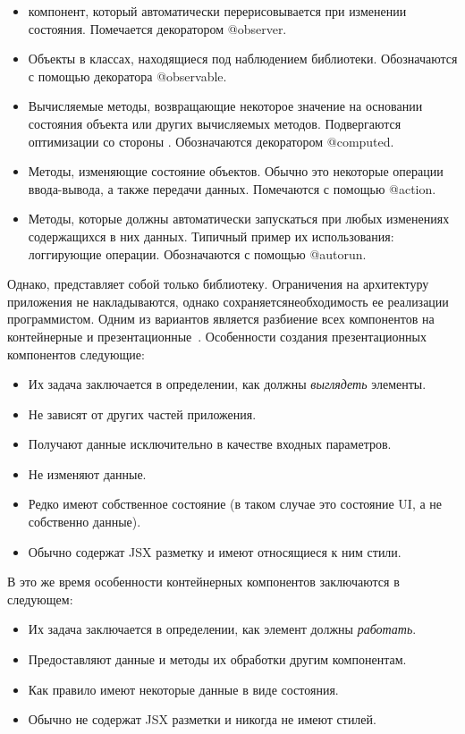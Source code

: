 \begin{itemize}
	\item \react компонент, который автоматически перерисовывается при изменении состояния. Помечается декоратором @observer.
	\item Объекты в классах, находящиеся под наблюдением библиотеки. Обозначаются с помощью декоратора @observable.
	\item Вычисляемые методы, возвращающие некоторое значение на основании состояния объекта или других вычисляемых методов. Подвергаются оптимизации со стороны \mobx. Обозначаются декоратором @computed.
	\item Методы, изменяющие состояние объектов. Обычно это некоторые операции ввода-вывода, а также передачи данных. Помечаются с помощью @ac\-ti\-on.
	\item Методы, которые должны автоматически запускаться при любых изменениях содержащихся в них данных. Типичный пример их использования: логгирующие операции. Обозначаются с помощью @autorun.
\end{itemize}

Однако, \mobx представляет собой только библиотеку. Ограничения на архитектуру приложения не накладываются, однако сохраняется\linebreak необходимость ее реализации программистом. Одним из вариантов является разбиение всех компонентов на контейнерные и презентационные~\cite{presentational_and_container_components}. Особенности создания презентационных компонентов следующие:

\begin{itemize}
	\item Их задача заключается в определении, как должны \emph{выглядеть} элементы.
	\item Не зависят от других частей приложения.
	\item Получают данные исключительно в качестве входных параметров.
	\item Не изменяют данные.
	\item Редко имеют собственное состояние (в таком случае это состояние UI, а не собственно данные).
	\item Обычно содержат JSX разметку и имеют относящиеся к ним стили.
\end{itemize}

В это же время особенности контейнерных компонентов заключаются в следующем:

\begin{itemize}
	\item Их задача заключается в определении, как элемент должны \emph{работать}.
	\item Предоставляют данные и методы их обработки другим компонентам.
	\item Как правило имеют некоторые данные в виде состояния.
	\item Обычно не содержат JSX разметки и никогда не имеют стилей.
\end{itemize}


